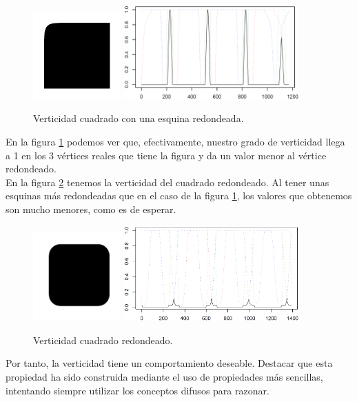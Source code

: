 \begin{figure}[H]
\begin{center}

\includegraphics[width=0.3\textwidth]{img/fig4.png} \hfill \includegraphics[width=0.6\textwidth]{img/vert-fig04-novvery.png}
\end{center}

\caption{Verticidad cuadrado con una esquina redondeada.}
\label{fig11}
\end{figure}

En la figura \ref{fig11} podemos ver que, efectivamente, nuestro grado de verticidad llega a 1 en los 3 vértices reales que tiene la figura y da un valor menor al vértice redondeado.\\

En la figura \ref{fig12} tenemos la verticidad del cuadrado redondeado. Al tener unas esquinas más redondeadas que en el caso de la figura \ref{fig11}, los valores que obtenemos son mucho menores, como es de esperar.\\

\begin{figure}[H]
\begin{center}

\includegraphics[width=0.3\textwidth]{img/device3-1.png} \hfill \includegraphics[width=0.6\textwidth]{img/vert-dev3-1-limpio.png}
\end{center}

\caption{Verticidad cuadrado redondeado.}
\label{fig12}
\end{figure}

Por tanto, la verticidad tiene un comportamiento deseable. Destacar que esta propiedad ha sido construida mediante el uso de propiedades más sencillas, intentando siempre utilizar los conceptos difusos para razonar.\\

